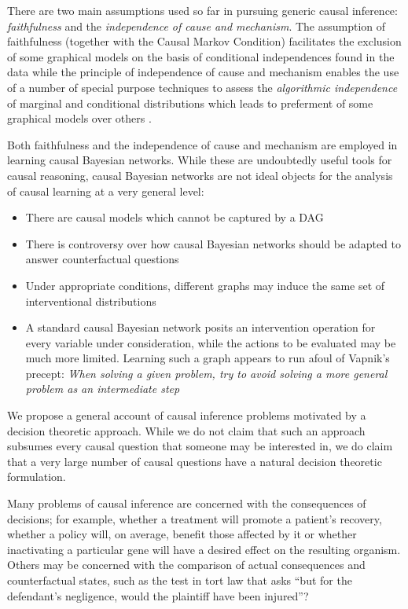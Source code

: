 There are two main assumptions used so far in pursuing generic causal inference: \emph{faithfulness} and the \emph{independence of cause and mechanism}. The assumption of faithfulness (together with the Causal Markov Condition) facilitates the exclusion of some graphical models on the basis of conditional independences found in the data \citep{spirtes_causation_1993} while the principle of independence of cause and mechanism enables the use of a number of special purpose techniques to assess the \emph{algorithmic independence} of marginal and conditional distributions which leads to preferment of some graphical models over others \citep{lemeire_replacing_2013, peters_identifiability_2012}.



Both faithfulness and the independence of cause and mechanism are employed in learning causal Bayesian networks. While these are undoubtedly useful tools for causal reasoning, causal Bayesian networks are not ideal objects for the analysis of causal learning at a very general level:
\begin{itemize}
    \item There are causal models which cannot be captured by a DAG \citep{dawid_beware_2010,bongers_theoretical_2016}
    \item There is controversy over how causal Bayesian networks should be adapted to answer counterfactual questions \citep{richardson2013single}
    \item Under appropriate conditions, different graphs may induce the same set of interventional distributions \citep{peters_structural_2015}
    \item A standard causal Bayesian network posits an intervention operation for every variable under consideration, while the actions to be evaluated may be much more limited. Learning such a graph appears to run afoul of Vapnik's precept: \emph{When solving a given problem, try to avoid solving a more general problem as an intermediate step} \citep{vapnik_nature_2013}
\end{itemize}

We propose a general account of causal inference problems motivated by a decision theoretic approach. While we do not claim that such an approach subsumes every causal question that someone may be interested in, we do claim that a very large number of causal questions have a natural decision theoretic formulation.

Many problems of causal inference are concerned with the consequences of decisions; for example, whether a treatment will promote a patient's recovery, whether a policy will, on average, benefit those affected by it or whether inactivating a particular gene will have a desired effect on the resulting organism. Others may be concerned with the comparison of actual consequences and counterfactual states, such as the test in tort law that asks ``but for the defendant's negligence, would the plaintiff have been injured''? 

